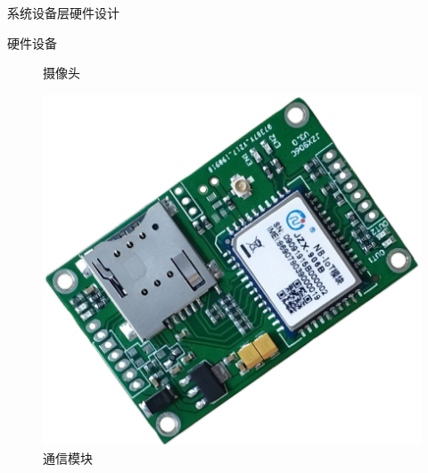 \documentclass{beamer}
\begin{document}
\begin{frame}{系统设备层硬件设计}
\begin{textbox}{硬件设备}
\begin{minipage}{0.25\linewidth}
\begin{figure}[h]
            \caption{摄像头}
            \label{摄像头}
        \end{figure}
    \end{minipage}\hspace{1cm}
    \begin{minipage}{0.25\linewidth}
        \medskip
        \begin{figure}[h]
            \centering
            \includegraphics[height=.25\textheight]{Picture/nb.png}
            \caption{通信模块}
            \label{NB-IoT 通信模块}
        \end{figure}
    \end{minipage}
    \end{textbox}
\end{frame}
\end{document}
